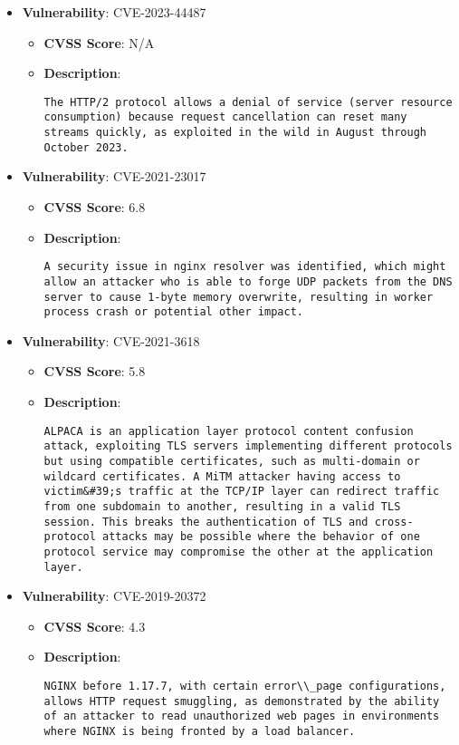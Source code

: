 \documentclass{article}
\begin{document}
\begin{itemize}
    
        \item \textbf{Vulnerability}: CVE-2023-44487
        \begin{itemize}
            \item \textbf{CVSS Score}:  N/A 
            \item \textbf{Description}:
            \parbox[t]{0.9\linewidth}{
                \verb|The HTTP/2 protocol allows a denial of service (server resource consumption) because request cancellation can reset many streams quickly, as exploited in the wild in August through October 2023.|
            }
        \end{itemize}
    
        \item \textbf{Vulnerability}: CVE-2021-23017
        \begin{itemize}
            \item \textbf{CVSS Score}:  6.8 
            \item \textbf{Description}:
            \parbox[t]{0.9\linewidth}{
                \verb|A security issue in nginx resolver was identified, which might allow an attacker who is able to forge UDP packets from the DNS server to cause 1-byte memory overwrite, resulting in worker process crash or potential other impact.|
            }
        \end{itemize}
    
        \item \textbf{Vulnerability}: CVE-2021-3618
        \begin{itemize}
            \item \textbf{CVSS Score}:  5.8 
            \item \textbf{Description}:
            \parbox[t]{0.9\linewidth}{
                \verb|ALPACA is an application layer protocol content confusion attack, exploiting TLS servers implementing different protocols but using compatible certificates, such as multi-domain or wildcard certificates. A MiTM attacker having access to victim&#39;s traffic at the TCP/IP layer can redirect traffic from one subdomain to another, resulting in a valid TLS session. This breaks the authentication of TLS and cross-protocol attacks may be possible where the behavior of one protocol service may compromise the other at the application layer.|
            }
        \end{itemize}
    
        \item \textbf{Vulnerability}: CVE-2019-20372
        \begin{itemize}
            \item \textbf{CVSS Score}:  4.3 
            \item \textbf{Description}:
            \parbox[t]{0.9\linewidth}{
                \verb|NGINX before 1.17.7, with certain error\\_page configurations, allows HTTP request smuggling, as demonstrated by the ability of an attacker to read unauthorized web pages in environments where NGINX is being fronted by a load balancer.|
            }
        \end{itemize}
    

\end{itemize}
\end{document}
